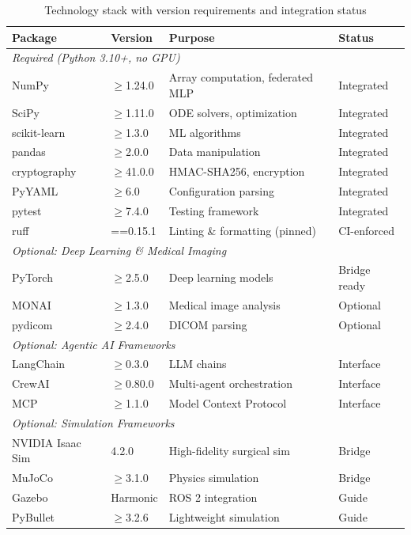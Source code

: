 \begin{table}[H]
\centering
\caption{Technology stack with version requirements and integration status}
\label{tab:techstack}
\small
\begin{tabular}{@{}llll@{}}
\toprule
\textbf{Package} & \textbf{Version} & \textbf{Purpose} & \textbf{Status} \\
\midrule
\multicolumn{4}{l}{\textit{Required (Python 3.10+, no GPU)}} \\
NumPy & $\geq$1.24.0 & Array computation, federated MLP & Integrated \\
SciPy & $\geq$1.11.0 & ODE solvers, optimization & Integrated \\
scikit-learn & $\geq$1.3.0 & ML algorithms & Integrated \\
pandas & $\geq$2.0.0 & Data manipulation & Integrated \\
cryptography & $\geq$41.0.0 & HMAC-SHA256, encryption & Integrated \\
PyYAML & $\geq$6.0 & Configuration parsing & Integrated \\
pytest & $\geq$7.4.0 & Testing framework & Integrated \\
ruff & ==0.15.1 & Linting \& formatting (pinned) & CI-enforced \\
\midrule
\multicolumn{4}{l}{\textit{Optional: Deep Learning \& Medical Imaging}} \\
PyTorch & $\geq$2.5.0 & Deep learning models & Bridge ready \\
MONAI & $\geq$1.3.0 & Medical image analysis & Optional \\
pydicom & $\geq$2.4.0 & DICOM parsing & Optional \\
\midrule
\multicolumn{4}{l}{\textit{Optional: Agentic AI Frameworks}} \\
LangChain & $\geq$0.3.0 & LLM chains & Interface \\
CrewAI & $\geq$0.80.0 & Multi-agent orchestration & Interface \\
MCP & $\geq$1.1.0 & Model Context Protocol & Interface \\
\midrule
\multicolumn{4}{l}{\textit{Optional: Simulation Frameworks}} \\
NVIDIA Isaac Sim & 4.2.0 & High-fidelity surgical sim & Bridge \\
MuJoCo & $\geq$3.1.0 & Physics simulation & Bridge \\
Gazebo & Harmonic & ROS 2 integration & Guide \\
PyBullet & $\geq$3.2.6 & Lightweight simulation & Guide \\
\bottomrule
\end{tabular}
\end{table}

